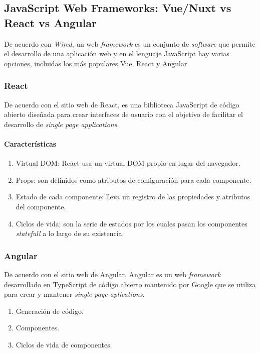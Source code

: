\subsection{JavaScript Web Frameworks: Vue/Nuxt vs React vs Angular}

De acuerdo con \textit{Wired}\cite{wired_wired_2020}, un web \textit{framework} es un conjunto de \textit{software} que permite el desarrollo de una aplicación web y en el lenguaje JavaScript hay varias opciones, incluidas los más populares Vue, React y Angular.

\subsubsection*{React}
De acuerdo con el sitio web de React\cite{react_react_2020}, es una biblioteca JavaScript de código abierto diseñada para crear interfaces de usuario con el objetivo de facilitar el desarrollo de \textit{single page applications}.

\paragraph*{Características}
\begin{enumerate}
    \item Virtual DOM: React usa un virtual DOM propio en lugar del navegador.
    \item Props: son definidos como atributos de configuración para cada componente.
    \item Estado de cada componente: lleva un registro de las propiedades y atributos del componente.
    \item Ciclos de vida: son la serie de estados por los cuales pasan los componentes \textit{statefull} a lo largo de su existencia. 
\end{enumerate}

\subsubsection*{Angular}
De acuerdo con el sitio web de Angular\cite{angular_angular_2020}, Angular es un web \textit{framework} desarrollado en TypeScript de código abierto mantenido por Google que se utiliza para crear y mantener \textit{single page aplications}. 

\begin{enumerate}
    \item Generación de código.
    \item Componentes.
    \item Ciclos de vida de componentes.
    
\end{enumerate}

